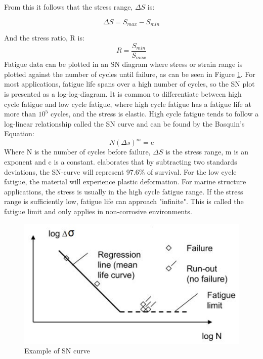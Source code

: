 From this it follows that the stress range, $\Delta S$ is:

\begin{equation}
    \Delta S =S_{max} - S_{min}
\end{equation}

\noindent And the stress ratio, R is:
\begin{equation}
    R=\frac{S_{min}}{S_{max}}
\end{equation}
Fatigue data can be plotted in an SN diagram where stress or strain range is plotted against the number of cycles until failure, as can be seen in Figure \ref{fig:sn}. For most applications, fatigue life spans over a high number of cycles, so the SN plot is presented as a log-log-diagram. It is common to differentiate between high cycle fatigue and low cycle fatigue, where high cycle fatigue has a fatigue life at more than $10^5$ cycles, and the stress is elastic. High cycle fatigue tends to follow a log-linear relationship called the SN curve and can be found by the Basquin’s Equation:
\begin{equation}
    N(\Delta s)^m = \text{c}
\end{equation}
\label{eq:sn}
\noindernt Where N is the number of cycles before failure, $\Delta S$ is the stress range, m is an exponent and c is a constant. \cite{dnvfatigue} elaborates that by subtracting two standards deviations, the SN-curve will represent 97.6\% of survival. \newline
\newline
For the low cycle fatigue, the material will experience plastic deformation. For marine structure applications, the stress is usually in the high cycle fatigue range. If the stress range is sufficiently low, fatigue life can approach "infinite". This is called the fatigue limit and only applies in non-corrosive environments. 

\begin{figure}[h!]
\centering
\includegraphics[scale=1]{figures/sn}
\caption[$\; \:$Example of SN curve]{Example of SN curve  \cite{fatigue2016} }
 \label{fig:sn}
\end{figure}

